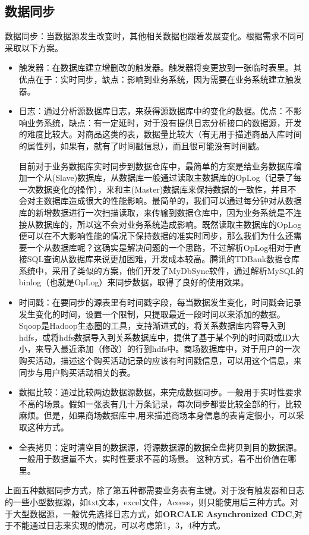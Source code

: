 \subsection{数据同步}
数据同步：当数据源发生改变时，其他相关数据也跟着发展变化。根据需求不同可采取以下方案。
\begin{itemize}
\item 触发器：在数据库建立增删改的触发器。触发器将变更放到一张临时表里。其优点在于：实时同步，缺点：影响到业务系统，因为需要在业务系统建立触发器。
\item 日志：通过分析源数据库日志，来获得源数据库中的变化的数据。优点：不影响业务系统，缺点：有一定延时，对于没有提供日志分析接口的数据源，开发的难度比较大。对商品这类的表，数据量比较大（有无用于描述商品入库时间的属性列，如果有，就有了时间戳信息），而且很可能没有时间戳。
\par \qquad 目前对于业务数据库实时同步到数据仓库中，最简单的方案是给业务数据库增加一个从(Slave)数据库，从数据库一般通过读取主数据库的OpLog（记录了每一次数据变化的操作），来和主(Master)数据库来保持数据的一致性，并且不会对主数据库造成很大的性能影响。最简单的，我们可以通过每分钟对从数据库的新增数据进行一次扫描读取，来传输到数据仓库中，因为业务系统是不连接从数据库的，所以这不会对业务系统造成影响。既然读取主数据库的OpLog便可以在不大影响性能的情况下保持数据的准实时同步，那么我们为什么还需要一个从数据库呢？这确实是解决问题的一个思路，不过解析OpLog相对于直接SQL查询从数据库来说更加困难，开发成本较高。腾讯的TDBank数据仓库系统中，采用了类似的方案，他们开发了MyDbSync软件，通过解析MySQL的binlog（也就是OpLog）来同步数据，取得了良好的使用效果。 
\item 时间戳：在要同步的源表里有时间戳字段，每当数据发生变化，时间戳会记录发生变化的时间，设置一个限制，只提取最近一段时间以来添加的数据。Sqoop是Hadoop生态圈的工具，支持渐进式的，将关系数据库内容导入到hdfs，或将hdfs数据导入到关系数据库中，提供了基于某个列的时间戳或ID大小，来导入最近添加（修改）的行到hdfs中。商场数据库中，对于用户的一次购买活动，描述这个购买活动记录的应该有时间戳信息，可以用这个信息，来同步与用户购买活动相关的表。
\item 数据比较：通过比较两边数据源数据，来完成数据同步。一般用于实时性要求不高的场景。假如一张表有几十万条记录，每次同步都要比较全部的行，比较麻烦。但是，如果商场数据库中,用来描述商场本身信息的表肯定很小，可以采取这种方式。
\item 全表拷贝：定时清空目的数据源，将源数据源的数据全盘拷贝到目的数据源。一般用于数据量不大，实时性要求不高的场景。
这种方式，看不出价值在哪里。
\end{itemize}
\par 上面五种数据同步方式，除了第五种都需要业务表有主键。对于没有触发器和日志的一些小型数据源，如txt文本，excel文件，Aceess，则只能使用后三种方式。对于大型数据源，一般优先选择日志方式，如\textbf{ORCALE Asynchronized CDC},对于不能通过日志来实现的情况，可以考虑第1，3，4种方式。
